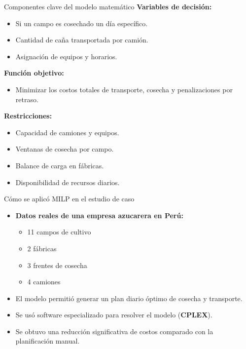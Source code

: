 \documentclass{beamer}
\begin{document}
\begin{frame}{Componentes clave del modelo matemático}
  \textbf{Variables de decisión:}
  \begin{itemize}
    \item Si un campo es cosechado un día específico.
    \item Cantidad de caña transportada por camión.
    \item Asignación de equipos y horarios.
  \end{itemize}

  \vspace{0.3cm}
  \textbf{Función objetivo:}
  \begin{itemize}
    \item Minimizar los costos totales de transporte, cosecha y penalizaciones por retraso.
  \end{itemize}

  \vspace{0.3cm}
  \textbf{Restricciones:}
  \begin{itemize}
    \item Capacidad de camiones y equipos.
    \item Ventanas de cosecha por campo.
    \item Balance de carga en fábricas.
    \item Disponibilidad de recursos diarios.
  \end{itemize}
\end{frame}

\begin{frame}{Cómo se aplicó MILP en el estudio de caso}
  \begin{itemize}
    \item \textbf{Datos reales de una empresa azucarera en Perú:}
    \begin{itemize}
      \item 11 campos de cultivo
      \item 2 fábricas
      \item 3 frentes de cosecha
      \item 4 camiones
    \end{itemize}
    \item El modelo permitió generar un plan diario óptimo de cosecha y transporte.
    \item Se usó software especializado para resolver el modelo (\textbf{CPLEX}).
    \item Se obtuvo una reducción significativa de costos comparado con la planificación manual.
  \end{itemize}
\end{frame}
\end{document}

